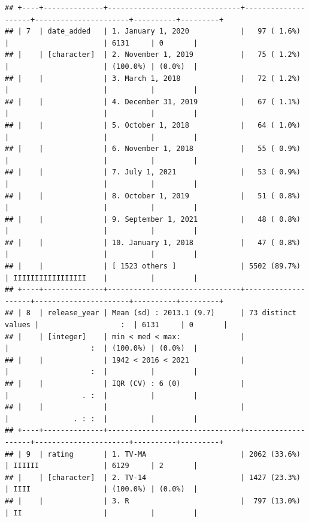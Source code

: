 \documentclass[11pt,preprint]{elsarticle}
\numberwithin{equation}{section}
\numberwithin{figure}{section}
\numberwithin{table}{section}
\begin{document}
\begin{verbatim}
## +----+--------------+-------------------------------+--------------------+----------------------+----------+---------+
## | 7  | date_added   | 1. January 1, 2020            |   97 ( 1.6%)       |                      | 6131     | 0       |
## |    | [character]  | 2. November 1, 2019           |   75 ( 1.2%)       |                      | (100.0%) | (0.0%)  |
## |    |              | 3. March 1, 2018              |   72 ( 1.2%)       |                      |          |         |
## |    |              | 4. December 31, 2019          |   67 ( 1.1%)       |                      |          |         |
## |    |              | 5. October 1, 2018            |   64 ( 1.0%)       |                      |          |         |
## |    |              | 6. November 1, 2018           |   55 ( 0.9%)       |                      |          |         |
## |    |              | 7. July 1, 2021               |   53 ( 0.9%)       |                      |          |         |
## |    |              | 8. October 1, 2019            |   51 ( 0.8%)       |                      |          |         |
## |    |              | 9. September 1, 2021          |   48 ( 0.8%)       |                      |          |         |
## |    |              | 10. January 1, 2018           |   47 ( 0.8%)       |                      |          |         |
## |    |              | [ 1523 others ]               | 5502 (89.7%)       | IIIIIIIIIIIIIIIII    |          |         |
## +----+--------------+-------------------------------+--------------------+----------------------+----------+---------+
## | 8  | release_year | Mean (sd) : 2013.1 (9.7)      | 73 distinct values |                   :  | 6131     | 0       |
## |    | [integer]    | min < med < max:              |                    |                   :  | (100.0%) | (0.0%)  |
## |    |              | 1942 < 2016 < 2021            |                    |                   :  |          |         |
## |    |              | IQR (CV) : 6 (0)              |                    |                 . :  |          |         |
## |    |              |                               |                    |               . : :  |          |         |
## +----+--------------+-------------------------------+--------------------+----------------------+----------+---------+
## | 9  | rating       | 1. TV-MA                      | 2062 (33.6%)       | IIIIII               | 6129     | 2       |
## |    | [character]  | 2. TV-14                      | 1427 (23.3%)       | IIII                 | (100.0%) | (0.0%)  |
## |    |              | 3. R                          |  797 (13.0%)       | II                   |          |         |

\end{verbatim}
\end{document}
